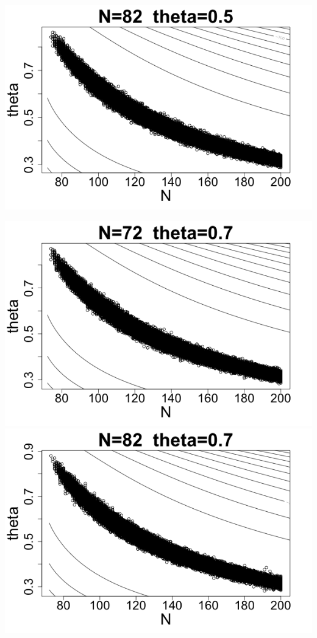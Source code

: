 \documentclass[letterpaper,10pt]{amsart}
\begin{document}
\begin{enumerate}[{1}.1]
\begin{center}
\includegraphics[scale=0.25]{Stat221Waterbuck8.png}
\end{center}
\begin{center}
\includegraphics[scale=0.25]{Stat221Waterbuck4.png}
\includegraphics[scale=0.25]{Stat221Waterbuck9.png}

\end{center}
\end{enumerate}
\end{document}
